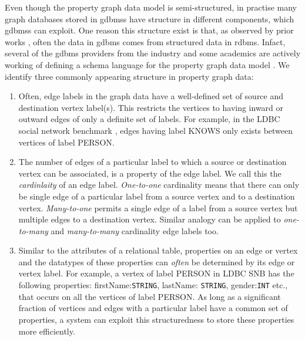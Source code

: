 \begin{guideline}
\label{gdln:graph-schema}
Even though the property graph data model is semi-structured, in practise many graph databases stored in \gls{gdbms}s have structure in different components, which \gls{gdbms}s can exploit. One reason this structure exist is that, as observed by prior works \cite{survey}, often the data in \gls{gdbms} comes from structured data in \gls{rdbms}. Infact, several of the \gls{gdbms} providers from the industry and some academics are actively working of defining a schema language for the property graph data model \cite{schema-validation-bonifati, defining-schema-hartig}. We identify three commonly appearing structure in property graph data:

\begin{enumerate}
	
	\item Often, edge labels in the graph data have a well-defined set of source and destination vertex label(s). This restricts the vertices to  having inward or outward edges of only a definite set of labels. For example, in the LDBC social network benchmark \cite{ldbc}, edges having label KNOWS only exists between vertices of label PERSON.
	\label{gdln:graph-schema-rule1}
	
	\item The number of edges of a particular label to which a source or destination vertex can be associated, is a property of the edge label. We call this the \emph{cardinlaity} of an edge label. \emph{One-to-one} cardinality means that there can only be single edge of a particular label from a source vertex and to a destination vertex. \emph{Many-to-one} permits a single edge of a label from a source vertex but multiple edges to a destination vertex. Similar analogy can be applied to \emph{one-to-many} and \emph{many-to-many} cardinality edge labels too.
	\label{gdln:graph-schema-rule2}
	
	\item Similar to the attributes of a relational table, properties on an edge or vertex and the datatypes of these properties can \emph{often} be determined by its edge or vertex label. For example, a vertex of label PERSON in LDBC SNB has the following properties: firstName:\texttt{STRING}, lastName: \texttt{STRING}, gender:\texttt{INT} etc., that occurs on all the vertices of label PERSON. As long as a significant fraction of vertices and edges with a particular label have a common set of properties, a system can exploit this structuredness to store these properties more efficiently. 
	

\end{enumerate}
\end{guideline}
